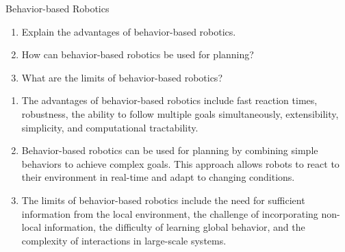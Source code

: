 \documentclass{article}
\begin{document}
\begin{exercise}{Behavior-based Robotics}
  \begin{enumerate}
    \item Explain the advantages of behavior-based robotics.
    \item How can behavior-based robotics be used for planning?
    \item What are the limits of behavior-based robotics?
  \end{enumerate}

  \begin{solution}
    \begin{enumerate}
      \item The advantages of behavior-based robotics include fast reaction times, robustness, the ability to follow multiple goals simultaneously, extensibility, simplicity, and computational tractability.
      \item Behavior-based robotics can be used for planning by combining simple behaviors to achieve complex goals. This approach allows robots to react to their environment in real-time and adapt to changing conditions.
      \item The limits of behavior-based robotics include the need for sufficient information from the local environment, the challenge of incorporating non-local information, the difficulty of learning global behavior, and the complexity of interactions in large-scale systems.
    \end{enumerate}
  \end{solution}
\end{exercise}
\end{document}
